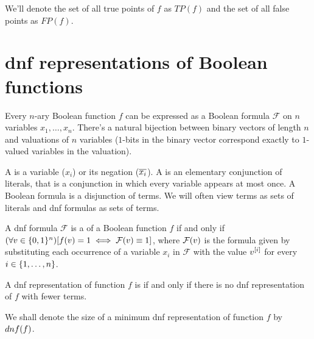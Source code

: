 We'll denote the set of all true points of $f$ as $TP(f)$
and the set of all false points as $FP(f)$.

\section{\texorpdfstring{\acrshort{dnf}}{DNF}
representations of Boolean functions}

Every $n$-ary Boolean function $f$ can be expressed
as a Boolean formula $\mathcal{F}$ on $n$ variables
$x_1, \ldots, x_n$.
There's a natural bijection
between binary vectors of length $n$
and valuations of $n$ variables
($1$-bits in the binary vector
correspond exactly to $1$-valued variables
in the valuation).


\begin{definition}
A  is
a variable ($x_i$) or its negation ($\overline{x_i}$).
A  is
an elementary conjunction of literals,
that is a conjunction in which every variable appears
at most once.
A  Boolean formula
is a disjunction of terms.
We will often view terms as sets of literals
and \acrshort{dnf} formulas as sets of terms.
\end{definition}

A \acrshort{dnf} formula $\mathcal{F}$ is
a 
of a Boolean function $f$
if and only if
$(\forall v \in \{0, 1\}^n) [f(v) = 1 \iff
\mathcal{F} (v) \equiv 1]$,
where $\mathcal{F} (v)$ is the formula
given by substituting
each occurrence of a variable $x_i$ in $\mathcal{F}$
with the value $v^{[i]}$
for every $i \in \{1, \ldots, n\}$.

\begin{definition}
A \acrshort{dnf} representation of function $f$ is
if and only if
there is no \acrshort{dnf} representation of $f$
with fewer terms.

We shall denote the size of
a minimum \acrshort{dnf} representation
of function $f$
by $dnf (f)$.
\end{definition}

